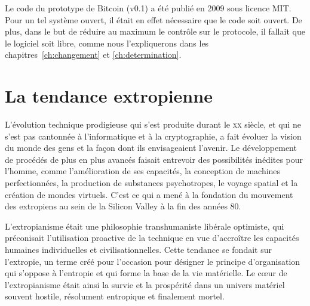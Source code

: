 Le code du prototype de Bitcoin (v0.1) a été publié en 2009 sous licence MIT. Pour un tel système ouvert, il était en effet nécessaire que le code soit ouvert. De plus, dans le but de réduire au maximum le contrôle sur le protocole, il fallait que le logiciel soit libre, comme nous l'expliquerons dans les chapitres~\ref{ch:changement} et \ref{ch:determination}.


\section*{La tendance extropienne}

L'évolution technique prodigieuse qui s'est produite durant le \textsc{xx}\ieme{} siècle, et qui ne s'est pas cantonnée à l'informatique et à la cryptographie, a fait évoluer la vision du monde des gens et la façon dont ils envisageaient l'avenir. Le développement de procédés de plus en plus avancés faisait entrevoir des possibilités inédites pour l'homme, comme l'amélioration de ses capacités, la conception de machines perfectionnées, la production de substances psychotropes, le voyage spatial et la création de mondes virtuels. C'est ce qui a mené à la fondation du mouvement des extropiens au sein de la Silicon Valley à la fin des années 80.


L'extropianisme était une philosophie transhumaniste libérale optimiste, qui préconisait l'utilisation proactive de la technique en vue d'accroître les capacités humaines individuelles et civilisationnelles. Cette tendance se fondait sur l'extropie, un terme créé pour l'occasion pour désigner le principe d'organisation qui s'oppose à l'entropie et qui forme la base de la vie matérielle. Le cœur de l'extropianisme était ainsi la survie et la prospérité dans un univers matériel souvent hostile, résolument entropique et finalement mortel.


